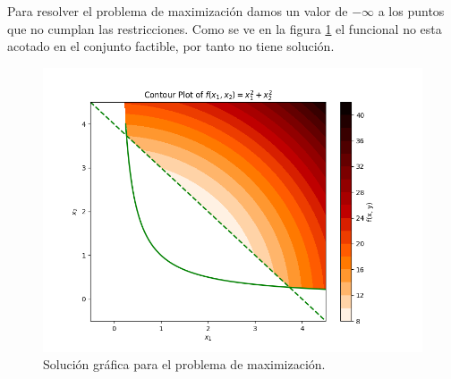 Para resolver el problema de maximización damos un valor de $-\infty$ a los puntos que no cumplan las restricciones.
Como se ve en la figura \ref{ex0_max} el funcional no esta acotado en el conjunto factible,
por tanto no tiene solución.

\begin{figure}[h]
\centering
\includegraphics[scale=0.6]{ex0_max.png}
\caption{Solución gráfica para el problema de maximización.}
\label{ex0_max}
\end{figure}

